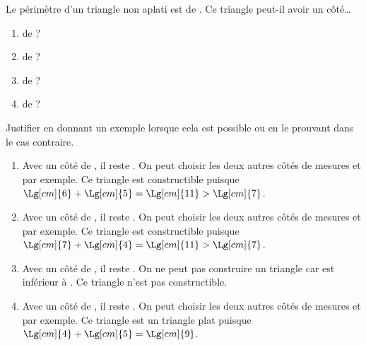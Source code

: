 \begin{exercice*}
   Le périmètre d'un triangle non aplati est de . Ce triangle peut-il avoir un côté\dots
   \begin{multicols}{2}
      \begin{enumerate}
         \item de  ?
         \item de  ?
         \item de  ?
         \item de  ?
      \end{enumerate}
   \end{multicols}
   Justifier en donnant un exemple lorsque cela est possible ou en le prouvant dans le cas contraire.

\end{exercice*}
\begin{corrige}
   \begin{enumerate}
      \item Avec un côté de , il reste . On peut choisir les deux autres côtés de mesures  et  par exemple. {\red Ce triangle est  constructible} puisque $\Lg[cm]{6}+\Lg[cm]{5} =\Lg[cm]{11} >\Lg[cm]{7}$. \smallskip
      \item Avec un côté de , il reste . On peut choisir les deux autres côtés de mesures  et  par exemple. {\red Ce triangle est constructible} puisque $\Lg[cm]{7}+\Lg[cm]{4} =\Lg[cm]{11} >\Lg[cm]{7}$. \smallskip
      \item Avec un côté de , il reste . On ne peut pas construire un triangle car  est inférieur à . {\red Ce triangle n'est pas constructible}. \smallskip
      \item Avec un côté de , il reste . On peut choisir les deux autres côtés de mesures  et  par exemple. {\red Ce triangle est un triangle plat} puisque $\Lg[cm]{4}+\Lg[cm]{5} =\Lg[cm]{9}$.
   \end{enumerate}
\end{corrige}

